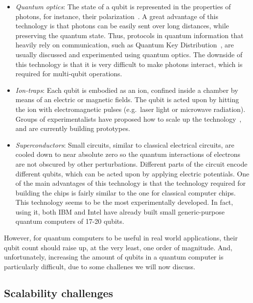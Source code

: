 \begin{itemize}

  \item \textit{Quantum optics}: The state of a qubit is represented in the properties of photons, for instance, their polarization~\citep{OpticsQC}. A great advantage of this technology is that photons can be easily sent over long distances, while preserving the quantum state. Thus, protocols in quantum information that heavily rely on communication, such as Quantum Key Distribution~\citep{QKD}, are usually discussed and experimented using quantum optics. The downside of this technology is that it is very difficult to make photons interact, which is required for multi-qubit operations.

  \item \textit{Ion-traps}: Each qubit is embodied as an ion, confined inside a chamber by means of an electric or magnetic fields. The qubit is acted upon by hitting the ion with electromagnetic pulses (e.g.\ laser light or microwave radiation). Groups of experimentalists have proposed how to scale up the technology~\citep{HensingerIonTraps}, and are currently building prototypes.

  \item \textit{Superconductors}: Small circuits, similar to classical electrical circuits, are cooled down to near absolute zero so the quantum interactions of electrons are not obscured by other perturbations. Different parts of the circuit encode different qubits, which can be acted upon by applying electric potentials. One of the main advantages of this technology is that the technology required for building the chips is fairly similar to the one for classical computer chips. This technology seems to be the most experimentally developed. In fact, using it, both IBM and Intel have already built small generic-purpose quantum computers of 17-20 qubits.

\end{itemize}

However, for quantum computers to be useful in real world applications, their qubit count should raise up, at the very least, one order of magnitude. And, unfortunately, increasing the amount of qubits in a quantum computer is particularly difficult, due to some challenes we will now discuss.


\subsection{Scalability challenges}
\label{Challenges}


